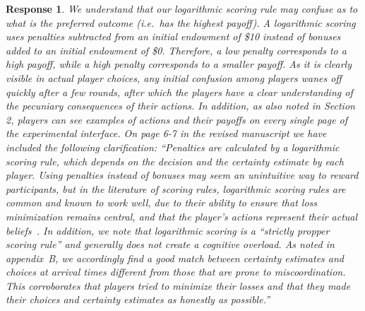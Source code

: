\documentclass[a4paper]{article}
\newtheorem{response}{Response}
\begin{document}
\begin{enumerate}
  \begin{response}\label{payoff2} 
  We understand that our logarithmic scoring rule may confuse as to what is the preferred outcome (i.e.\ has the highest payoff). A logarithmic scoring uses penalties subtracted from an initial endowment of \$10 instead of bonuses added to an initial endowment of \$0. Therefore, a low penalty corresponds to a high payoff, while a high penalty corresponds to a smaller payoff. As it is clearly visible in actual player choices, any initial confusion among players wanes off quickly after a few rounds, after which the players have a clear understanding of the pecuniary consequences of their actions. In addition, as also noted in Section 2, players can see examples of actions and their payoffs on every single page of the experimental interface. On page 6-7 in the revised manuscript we have included the following clarification: ``Penalties are calculated by a logarithmic scoring rule, which depends on the decision and the certainty estimate by each player. Using penalties instead of bonuses may seem an unintuitive way to reward participants, but in the literature of scoring rules, logarithmic scoring rules are common and known to work well, due to their ability to ensure that loss minimization remains central, and that the player's actions represent their actual beliefs~\cite{good1992rational, seidenfeld1985calibration, palfrey2009eliciting, mccutcheon2019favor}. In addition, we note that logarithmic scoring is a ``strictly propper scoring rule'' and generally does not create a cognitive overload. As noted in appendix~B, we accordingly find a good match between certainty estimates and choices at arrival times different from those that are prone to miscoordination. This corroborates that players tried to minimize their losses and that they made their choices and certainty estimates as honestly as possible.''
\end{response}


\end{enumerate}
\end{document}
